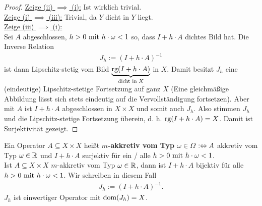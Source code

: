 \begin{proof}
\underline{Zeige (ii) $\implies$ (i):} Ist wirklich trivial.\\

\underline{Zeige (i) $\implies$ (iii):} Trivial, da $Y$ dicht in $Y$ liegt.\\

\underline{Zeige (iii) $\implies$ (i):}\\
Sei $A$ abgeschlossen, $h>0\mit h\cdot\omega<1$ so, dass $I+h\cdot A$ dichtes Bild hat. Die Inverse Relation
\begin{align*}
J_h:=(I+h\cdot A)^{-1}
\end{align*}
ist dann Lipschitz-stetig vom Bild $\underbrace{\rg(I+h\cdot A)}_{\text{dicht in }X}$ in $X$. Damit besitzt $J_h$ eine (eindeutige) Lipschitz-stetige Fortsetzung auf ganz $X$ (Eine gleichmäßige Abbildung lässt sich stets eindeutig auf die Vervollständigung fortsetzen). Aber mit $A$ ist $I+h\cdot A$ abgeschlossen in $X\times X$ und somit auch $J_h$. Also stimmen $J_h$ und die Lipschitz-stetige Fortsetzung überein, d. h. $\rg(I+h\cdot A)=X$. Damit ist Surjektivität gezeigt.
\end{proof}

\begin{definition}
Ein Operator $A\subseteq X\times X$ heißt \textbf{$m$-akkretiv vom Typ $\omega\in\Omega$} $:\gdw\\ A$ akkretiv vom Typ $\omega\in\R$ und $I+h\cdot A$ surjektiv für ein / alle $h>0\mit h\cdot\omega<1$.\\

Ist $A\subseteq X\times X$  $m$-akkretiv vom Typ $\omega\in\R$, dann ist $I+h\cdot A$ bijektiv für alle $h>0\mit h\cdot\omega<1$. Wir schreiben in diesem Fall
\begin{align*}
J_h:=(I+h\cdot A)^{-1}.
\end{align*}
$J_h$ ist einwertiger Operator mit $\dom(J_h)=X$.
\end{definition}

